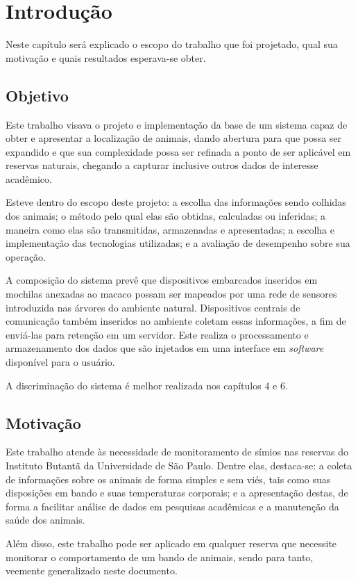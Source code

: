 \chapter{Introdução}
Neste capítulo será explicado o escopo do trabalho que foi projetado, qual sua motivação e quais resultados esperava-se obter.

\section{Objetivo}
Este trabalho visava o projeto e implementação da base de um sistema capaz de obter e apresentar a localização de animais, dando abertura para que possa ser expandido e que sua complexidade possa ser refinada a ponto de ser aplicável em reservas naturais, chegando a capturar inclusive outros dados de interesse acadêmico.

Esteve dentro do escopo deste projeto: a escolha das informações sendo colhidas dos animais; o método pelo qual elas são obtidas, calculadas ou inferidas; a maneira como elas são transmitidas, armazenadas e apresentadas; a escolha e implementação das tecnologias utilizadas; e a avaliação de desempenho sobre sua operação.

A composição do sistema prevê que dispositivos embarcados inseridos em mochilas anexadas ao macaco possam ser mapeados por uma rede de sensores introduzida nas árvores do ambiente natural. Dispositivos centrais de comunicação também inseridos no ambiente coletam essas informações, a fim de enviá-las para retenção em um servidor. Este realiza o processamento e armazenamento dos dados que são injetados em uma interface em \emph{software} disponível para o usuário.

A discriminação do sistema é melhor realizada nos capítulos 4 e 6.

\section{Motivação}
Este trabalho atende às necessidade de monitoramento de símios nas reservas do Instituto Butantã da Universidade de São Paulo. Dentre elas, destaca-se: a coleta de informações sobre os animais de forma simples e sem viés, tais como suas disposições em bando e suas temperaturas corporais; e a apresentação destas, de forma a facilitar análise de dados em  pesquisas acadêmicas e a manutenção da saúde dos animais.

Além disso, este trabalho pode ser aplicado em qualquer reserva que necessite monitorar o comportamento de um bando de animais, sendo para tanto, veemente generalizado neste documento.

